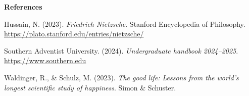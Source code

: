 \documentclass[12pt]{article}
\begin{document}
\newpage

\begin{center}
  \textbf{References}
\end{center}

\setlength{\hangindent}{0.5in}

\noindent Hussain, N. (2023). \textit{Friedrich Nietzsche}. Stanford Encyclopedia of Philosophy. \url{https://plato.stanford.edu/entries/nietzsche/}

\medskip
\noindent Southern Adventist University. (2024). \textit{Undergraduate handbook 2024--2025}. \url{https://www.southern.edu}

\medskip
\noindent Waldinger, R., \& Schulz, M. (2023). \textit{The good life: Lessons from the world's longest scientific study of happiness}. Simon \& Schuster.
\end{document}
